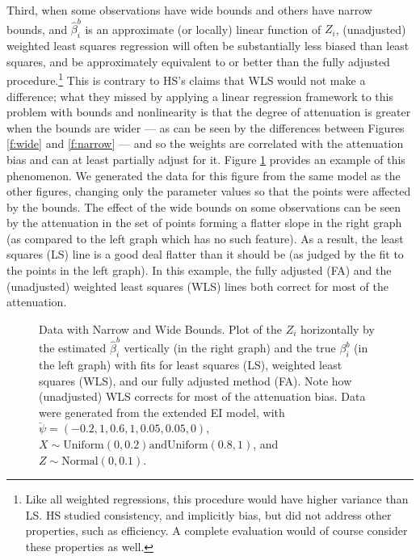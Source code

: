 \documentclass[11pt,titlepage]{article}
\begin{document}
Third, when some observations have wide bounds and others have narrow
bounds, and $\hat\beta_i^b$ is an approximate (or locally) linear
function of $Z_i$, (unadjusted) weighted least squares regression will
often be substantially less biased than least squares, and be
approximately equivalent to or better than the fully adjusted
procedure.\footnote{Like all weighted regressions, this procedure
  would have higher variance than LS. HS studied consistency, and
  implicitly bias, but did not address other properties, such as
  efficiency.  A complete evaluation would of course consider these
  properties as well.}  This is contrary to HS's claims that WLS would
not make a difference; what they missed by applying a linear
regression framework to this problem with bounds and nonlinearity is
that the degree of attenuation is greater when the bounds are wider
--- as can be seen by the differences between Figures \ref{f:wide} and
\ref{f:narrow} --- and so the weights are correlated with the
attenuation bias and can at least partially adjust for it.  Figure
\ref{f:mixed} provides an example of this phenomenon.  We generated
the data for this figure from the same model as the other figures,
changing only the parameter values so that the points were affected by
the bounds.  The effect of the wide bounds on some observations can be
seen by the attenuation in the set of points forming a flatter slope
in the right graph (as compared to the left graph which has no such
feature).  As a result, the least squares (LS) line is a good deal
flatter than it should be (as judged by the fit to the points in the
left graph).  In this example, the fully adjusted (FA) and the
(unadjusted) weighted least squares (WLS) lines both correct for most
of the attenuation.
\begin{figure}[t]
  \begin{center}
    \caption{Data with Narrow and Wide Bounds. Plot of the $Z_i$ 
      horizontally by the estimated $\hat\beta_i^b$ vertically (in the
      right graph) and the true $\beta_i^b$ (in the left graph) with
      fits for least squares (LS), weighted least squares (WLS), and
      our fully adjusted method (FA).  Note how (unadjusted) WLS
      corrects for most of the attenuation bias.  Data were generated
      from the extended EI model, with
      $\breve\psi=(-0.2,1,0.6,1,0.05,0.05,0)$, $X \sim
      \textrm{Uniform}(0,0.2) \textrm{and} \textrm{Uniform}(0.8,1)$, and $Z
      \sim \textrm{Normal}(0,0.1)$.}
    \label{f:mixed}
  \end{center}
\end{figure}
\end{document}
